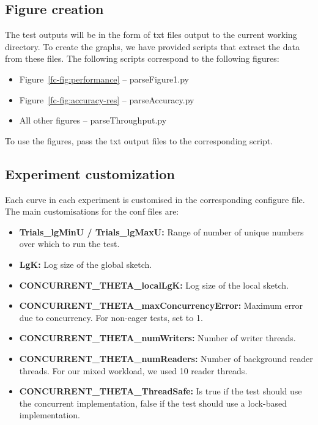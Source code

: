 \subsection{Figure creation}

The test outputs will be in the form of txt files output to the current working directory. To create the graphs, we
have provided scripts that extract the data from these files.
The following scripts correspond to the following figures:
\begin{itemize}
  \item Figure~\ref{fc-fig:performance} -- parseFigure1.py
  \item Figure~\ref{fc-fig:accuracy-res} -- parseAccuracy.py
  \item All other figures -- parseThroughput.py
\end{itemize}

To use the figures, pass the txt output files to the corresponding script.


\subsection{Experiment customization}

Each curve in each experiment is customised in the corresponding configure file.
The main customisations for the conf files are:
\begin{itemize}
  \item \textbf{Trials\_lgMinU / Trials\_lgMaxU:} Range of number of unique numbers over which to run the test.
  \item \textbf{LgK:} Log size of the global sketch.
  \item \textbf{CONCURRENT\_THETA\_localLgK:} Log size of the local sketch.
  \item \textbf{CONCURRENT\_THETA\_maxConcurrencyError:} Maximum error due to concurrency. For non-eager tests, set to 1.
  \item \textbf{CONCURRENT\_THETA\_numWriters:} Number of writer threads.
  \item \textbf{CONCURRENT\_THETA\_numReaders:} Number of background reader threads. For our mixed workload, we used 10 reader threads.  
  \item \textbf{CONCURRENT\_THETA\_ThreadSafe:} Is true if the test should use the concurrent implementation,
  false if the test should use a lock-based implementation.
\end{itemize}

